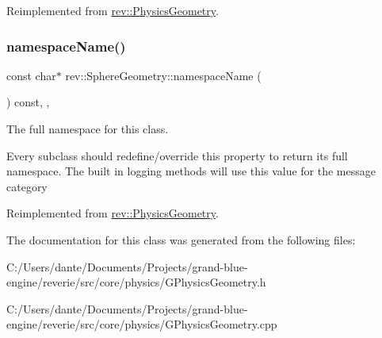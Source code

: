Reimplemented from \mbox{\hyperlink{classrev_1_1_physics_geometry_afc74d4c03367f3bc83595acaeca7d9a8}{rev\+::\+Physics\+Geometry}}.

\mbox{\label{classrev_1_1_sphere_geometry_aef6068a1ad9dc22c0ae744898923b7a2}} 
\subsubsection{\texorpdfstring{namespaceName()}{namespaceName()}}
{\footnotesize\ttfamily const char$\ast$ rev\+::\+Sphere\+Geometry\+::namespace\+Name (\begin{DoxyParamCaption}{ }\end{DoxyParamCaption}) const\hspace{0.3cm}{\ttfamily [inline]}, {\ttfamily [override]}, {\ttfamily [virtual]}}



The full namespace for this class. 

Every subclass should redefine/override this property to return its full namespace. The built in logging methods will use this value for the message category 

Reimplemented from \mbox{\hyperlink{classrev_1_1_physics_geometry_ad4311205e1a6eabeeb7773a01d11add5}{rev\+::\+Physics\+Geometry}}.



The documentation for this class was generated from the following files\+:\begin{DoxyCompactItemize}
\item 
C\+:/\+Users/dante/\+Documents/\+Projects/grand-\/blue-\/engine/reverie/src/core/physics/G\+Physics\+Geometry.\+h\item 
C\+:/\+Users/dante/\+Documents/\+Projects/grand-\/blue-\/engine/reverie/src/core/physics/G\+Physics\+Geometry.\+cpp\end{DoxyCompactItemize}
